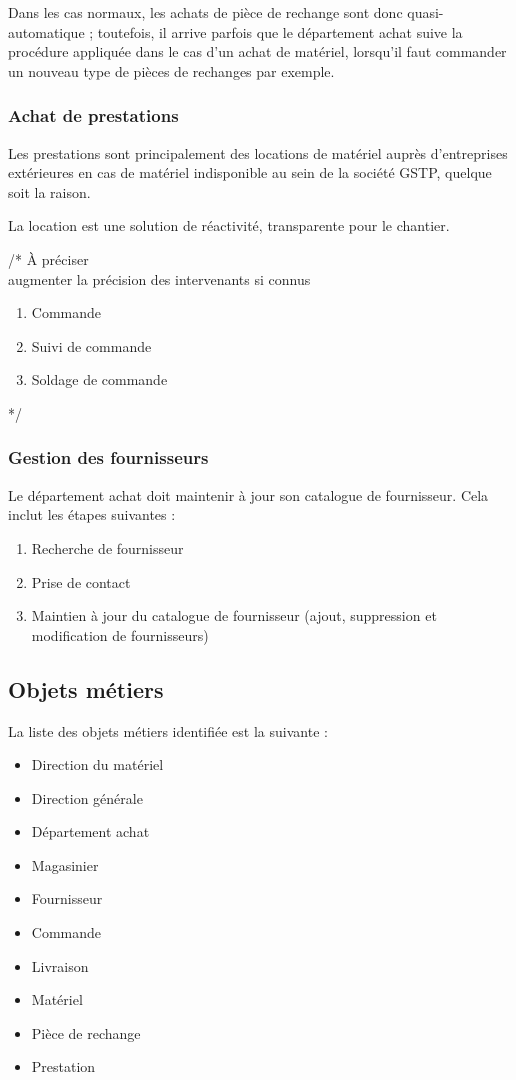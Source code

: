 Dans les cas normaux, les achats de pièce de rechange sont donc
quasi-automatique ; toutefois, il arrive parfois que le département achat
suive la procédure appliquée dans le cas d'un achat de matériel, lorsqu'il
faut commander un nouveau type de pièces de rechanges par exemple.


\subsubsection{Achat de prestations}

Les prestations sont principalement des locations de matériel auprès
d'entreprises extérieures en cas de matériel indisponible au sein de la
société GSTP, quelque soit la raison.

La location est une solution de réactivité, transparente pour le chantier.

/* À préciser\\
 augmenter la
précision des intervenants si connus

\begin{enumerate}
\item Commande 
\item Suivi de commande
\item Soldage de commande
\end{enumerate}
*/

\subsubsection{Gestion des fournisseurs}

Le département achat doit maintenir à jour son catalogue de fournisseur.
Cela inclut les étapes suivantes :
\begin{enumerate}
\item Recherche de fournisseur
\item Prise de contact
\item Maintien à jour du catalogue de fournisseur (ajout, suppression et
        modification de fournisseurs)
\end{enumerate}


\subsection{Objets métiers}

La liste des objets métiers identifiée est la suivante :

\begin{itemize}
\item Direction du matériel
\item Direction générale
\item Département achat
\item Magasinier
\item Fournisseur
\item Commande
\item Livraison
\item Matériel
\item Pièce de rechange
\item Prestation
\end{itemize}


